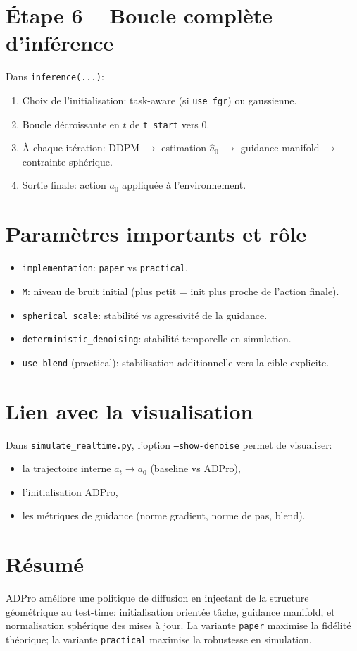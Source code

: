 \documentclass[11pt,a4paper]{article}
\begin{document}
\section{Étape 6 -- Boucle complète d'inférence}
Dans \texttt{inference(...)}:
\begin{enumerate}
\item Choix de l'initialisation: task-aware (si \texttt{use\_fgr}) ou gaussienne.
\item Boucle décroissante en $t$ de \texttt{t\_start} vers $0$.
\item À chaque itération: DDPM $\to$ estimation $\hat a_0$ $\to$ guidance manifold $\to$ contrainte sphérique.
\item Sortie finale: action $a_0$ appliquée à l'environnement.
\end{enumerate}

\section{Paramètres importants et rôle}
\begin{itemize}
\item \texttt{implementation}: \texttt{paper} vs \texttt{practical}.
\item \texttt{M}: niveau de bruit initial (plus petit = init plus proche de l'action finale).
\item \texttt{spherical\_scale}: stabilité vs agressivité de la guidance.
\item \texttt{deterministic\_denoising}: stabilité temporelle en simulation.
\item \texttt{use\_blend} (practical): stabilisation additionnelle vers la cible explicite.
\end{itemize}

\section{Lien avec la visualisation}
Dans \texttt{simulate\_realtime.py}, l'option \texttt{--show-denoise} permet de visualiser:
\begin{itemize}
\item la trajectoire interne $a_t\to a_0$ (baseline vs ADPro),
\item l'initialisation ADPro,
\item les métriques de guidance (norme gradient, norme de pas, blend).
\end{itemize}

\section{Résumé}
ADPro améliore une politique de diffusion en injectant de la structure géométrique au test-time:
initialisation orientée tâche, guidance manifold, et normalisation sphérique des mises à jour.
La variante \texttt{paper} maximise la fidélité théorique; la variante \texttt{practical} maximise la robustesse en simulation.
\end{document}
